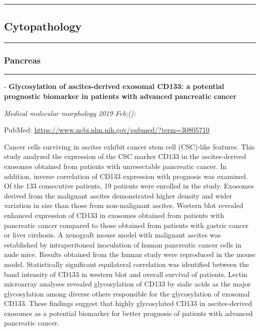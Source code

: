 \documentclass[]{article}
\begin{document}
\begin{center}\rule{0.5\linewidth}{\linethickness}\end{center}

\pagebreak

\hypertarget{cytopathology}{%
\subsection{Cytopathology}\label{cytopathology}}

\begin{center}\rule{0.5\linewidth}{\linethickness}\end{center}

\hypertarget{pancreas-1}{%
\subsubsection{Pancreas}\label{pancreas-1}}

\begin{center}\rule{0.5\linewidth}{\linethickness}\end{center}

 - \textbf{Glycosylation of ascites-derived exosomal CD133: a potential
prognostic biomarker in patients with advanced pancreatic cancer}

\emph{Medical molecular morphology 2019 Feb;():}

PubMed: \url{https://www.ncbi.nlm.nih.gov/pubmed/?term=30805710}

Cancer cells surviving in ascites exhibit cancer stem cell (CSC)-like
features. This study analyzed the expression of the CSC marker CD133 in
the ascites-derived exosomes obtained from patients with unresectable
pancreatic cancer. In addition, inverse correlation of CD133 expression
with prognosis was examined. Of the 133 consecutive patients, 19
patients were enrolled in the study. Exosomes derived from the malignant
ascites demonstrated higher density and wider variation in size than
those from non-malignant ascites. Western blot revealed enhanced
expression of CD133 in exosomes obtained from patients with pancreatic
cancer compared to those obtained from patients with gastric cancer or
liver cirrhosis. A xenograft mouse model with malignant ascites was
established by intraperitoneal inoculation of human pancreatic cancer
cells in nude mice. Results obtained from the human study were
reproduced in the mouse model. Statistically significant equilateral
correlation was identified between the band intensity of CD133 in
western blot and overall survival of patients. Lectin microarray
analyses revealed glycosylation of CD133 by sialic acids as the major
glycosylation among diverse others responsible for the glycosylation of
exosomal CD133. These findings suggest that highly glycosylated CD133 in
ascites-derived exosomes as a potential biomarker for better prognosis
of patients with advanced pancreatic cancer.
\end{document}
